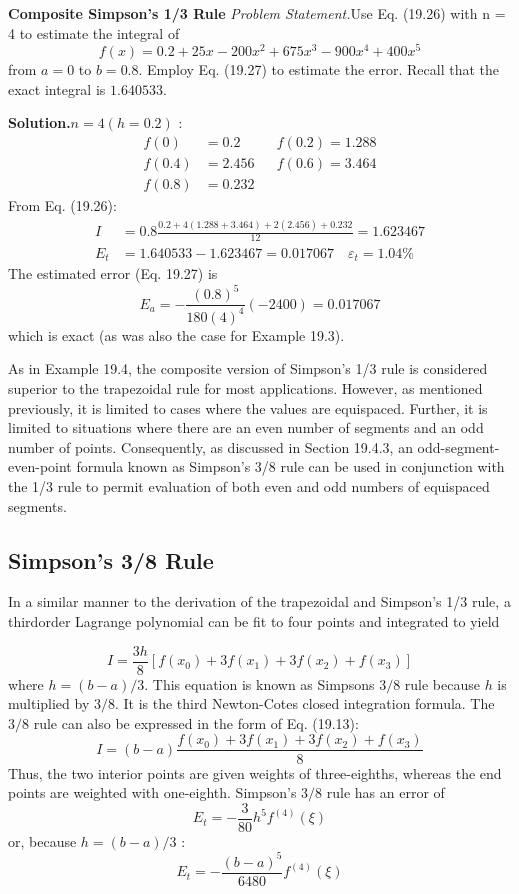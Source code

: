 \documentclass[../main.tex]{subfiles}
\begin{document}
		\begin{exmp} \textbf{Composite Simpson's 1/3 Rule}
			\noindent\textit{Problem Statement.}Use Eq. (19.26) with n = 4 to estimate the integral of
			$$
f(x)=0.2+25 x-200 x^{2}+675 x^{3}-900 x^{4}+400 x^{5}
$$
from $a=0$ to $b=0.8$. Employ Eq. (19.27) to estimate the error. Recall that the exact integral is $1.640533$.

			\noindent \textbf{Solution.}$n=4(h=0.2)$ :
			$$
			\begin{aligned}
			f(0) &=0.2 & & f(0.2)=1.288 \\
			f(0.4) &=2.456 & & f(0.6)=3.464 \\
			f(0.8) &=0.232 & &
			\end{aligned}
			$$
			From Eq. (19.26):
			$$
			\begin{aligned}
			I &=0.8 \frac{0.2+4(1.288+3.464)+2(2.456)+0.232}{12}=1.623467 \\
			E_{t} &=1.640533-1.623467=0.017067 \quad \varepsilon_{t}=1.04 \%
			\end{aligned}
			$$
			The estimated error (Eq. 19.27) is
			$$
			E_{a}=-\frac{(0.8)^{5}}{180(4)^{4}}(-2400)=0.017067
			$$
			which is exact (as was also the case for Example 19.3).
		\end{exmp}
		As in Example 19.4, the composite version of Simpson's 1/3 rule is considered superior to the trapezoidal rule for most applications. However, as mentioned previously, it is
		limited to cases where the values are equispaced. Further, it is limited to situations where
		there are an even number of segments and an odd number of points. Consequently, as discussed in Section 19.4.3, an odd-segment-even-point formula known as Simpson's 3/8
		rule can be used in conjunction with the 1/3 rule to permit evaluation of both even and odd
		numbers of equispaced segments.

		\subsection{ Simpson's 3/8 Rule}

		In a similar manner to the derivation of the trapezoidal and Simpson's 1/3 rule, a thirdorder Lagrange polynomial can be fit to four points and integrated to yield

		$$
I=\frac{3 h}{8}\left[f\left(x_{0}\right)+3 f\left(x_{1}\right)+3 f\left(x_{2}\right)+f\left(x_{3}\right)\right]
$$
where $h=(b-a) / 3$. This equation is known as Simpsons $3 / 8$ rule because $h$ is multiplied by $3 / 8$. It is the third Newton-Cotes closed integration formula. The $3 / 8$ rule can also be expressed in the form of Eq. (19.13):
\begin{equation}
    \tag{19.28}
I=(b-a) \frac{f\left(x_{0}\right)+3 f\left(x_{1}\right)+3 f\left(x_{2}\right)+f\left(x_{3}\right)}{8}
\end{equation}
Thus, the two interior points are given weights of three-eighths, whereas the end points are weighted with one-eighth. Simpson's $3 / 8$ rule has an error of
$$
E_{t}=-\frac{3}{80} h^{5} f^{(4)}(\xi)
$$
or, because $h=(b-a) / 3$ :
\begin{equation}
    \tag{19.29}
E_{t}=-\frac{(b-a)^{5}}{6480} f^{(4)}(\xi)
\end{equation}
\end{document}
